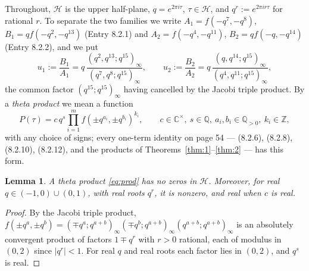 \documentclass[pdflatex,sn-mathphys-num]{sn-jnl}
\theoremstyle{thmstyleone}%
\newtheorem{lemma}[theorem]{Lemma}%
\theoremstyle{thmstyletwo}%
\newcommand{\f}{f}
\newcommand{\HH}{\mathcal{H}}
\begin{document}
Throughout, $\HH$ is the upper half-plane, $q=e^{2\pi i\tau}$, $\tau\in\HH$, and
$q^{r}:=e^{2\pi i r\tau}$ for rational $r$. To separate the two families we write
$A_1=\f(-q^7,-q^8)$, $B_1=q\f(-q^2,-q^{13})$ (Entry 8.2.1) and
$A_2=\f(-q^4,-q^{11})$, $B_2=q\f(-q,-q^{14})$ (Entry 8.2.2), and we put
\begin{equation}\label{eq:u}
u_1:=\frac{B_1}{A_1}=q\,\frac{(q^2,q^{13};q^{15})_\infty}{(q^7,q^8;q^{15})_\infty},\qquad
u_2:=\frac{B_2}{A_2}=q\,\frac{(q,q^{14};q^{15})_\infty}{(q^4,q^{11};q^{15})_\infty},
\end{equation}
the common factor $(q^{15};q^{15})_\infty$ having cancelled by the Jacobi triple product.
By a \emph{theta product} we mean a function
\begin{equation}\label{eq:prod}
P(\tau)=c\,q^{s}\prod_{i=1}^{m}\f(\pm q^{a_i},\pm q^{b_i})^{k_i},\qquad
c\in\mathbb{C}^\times,\ s\in\mathbb{Q},\ a_i,b_i\in\mathbb{Q}_{>0},\ k_i\in\mathbb{Z},
\end{equation}
with any choice of signs; every one-term identity on page 54 --- (8.2.6), (8.2.8), (8.2.10), (8.2.12), and the products of Theorems~\ref{thm:1}--\ref{thm:2} --- has this form.

\begin{lemma}\label{lem:nonvan}
A theta product \eqref{eq:prod} has no zeros in $\HH$. Moreover, for real
$q\in(-1,0)\cup(0,1)$, with real roots $q^{r}$, it is nonzero, and real when $c$ is real.
\end{lemma}
\begin{proof}
By the Jacobi triple product, $\f(\pm q^{a},\pm q^{b})=(\mp q^{a};q^{a+b})_\infty(\mp q^{b};q^{a+b})_\infty(q^{a+b};q^{a+b})_\infty$ is an absolutely convergent product of factors $1\mp q^{r}$ with $r>0$ rational, each of modulus in $(0,2)$ since $|q^{r}|<1$. For real $q$ and real roots each factor lies in $(0,2)$, and $q^{s}$ is real.
\end{proof}
\end{document}
